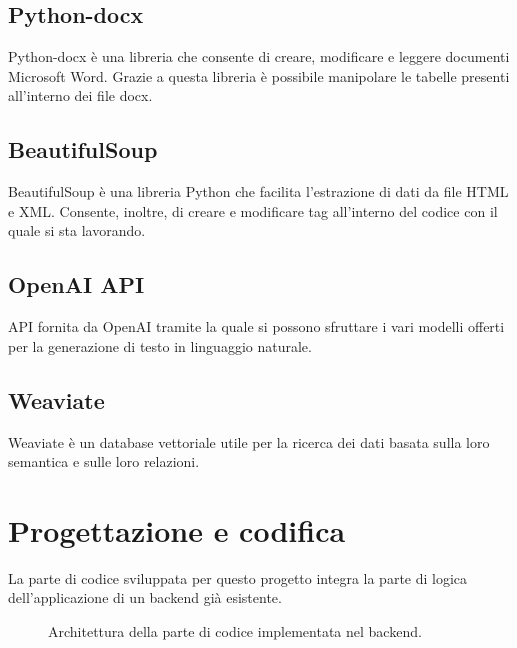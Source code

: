 \subsection{Python-docx}
\label{subsec:python-docx}
Python-docx è una libreria che consente di creare, modificare e leggere documenti Microsoft Word.
Grazie a questa libreria è possibile manipolare le tabelle presenti all'interno dei file docx.
\subsection{BeautifulSoup}
\label{subsec:beautifulsoup}
BeautifulSoup è una libreria Python che facilita l'estrazione di dati da file HTML e XML.
Consente, inoltre, di creare e modificare tag all'interno del codice con il quale si sta lavorando.
\subsection{OpenAI API}
API fornita da OpenAI tramite la quale si possono sfruttare i vari modelli offerti per la generazione di testo in linguaggio naturale.
\subsection{Weaviate}
\label{subsec:weav}
Weaviate è un database vettoriale utile per la ricerca dei dati basata sulla loro semantica e sulle loro relazioni. 

\section{Progettazione e codifica}
\label{sec:progettazione-codifica}
La parte di codice sviluppata per questo progetto integra la parte di logica dell'applicazione di un backend già esistente.

\begin{figure}[!h]
    \centering
    \caption{Architettura della parte di codice implementata nel backend.}
\end{figure}

